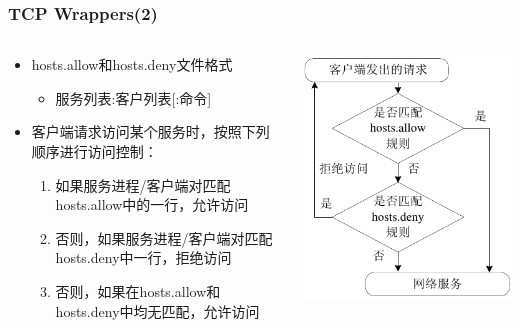 \documentclass[xcolor=svgnames,presentation]{beamer}
\begin{document}
\begin{frame}
\frametitle{TCP Wrappers(2)}
\label{sec-7-4}
\begin{columns}
\begin{column}{0.5\textwidth}
\begin{itemize}

\item hosts.allow和hosts.deny文件格式
\label{sec-7-4-1}%
\begin{itemize}

\item 服务列表:客户列表[:命令]
\label{sec-7-4-1-1}%
\end{itemize} %

\item 客户端请求访问某个服务时，按照下列顺序进行访问控制：
\label{sec-7-4-2}%
\begin{enumerate}
\item 如果服务进程/客户端对匹配hosts.allow中的一行，允许访问
\item 否则，如果服务进程/客户端对匹配hosts.deny中一行，拒绝访问
\item 否则，如果在hosts.allow和hosts.deny中均无匹配，允许访问
\end{enumerate}
\end{itemize} %
\end{column}
\begin{column}{0.5\textwidth}
\label{sec-7-4-3}

\includegraphics[width=.9\linewidth]{img/tcpwrapper.png}
\end{column}
\end{columns}
\end{frame}
\end{document}

